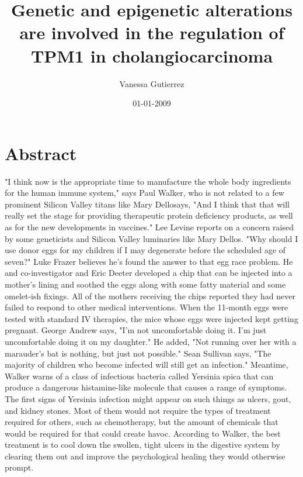 \documentclass{article}%
\title{Genetic and epigenetic alterations are involved in the regulation of TPM1 in cholangiocarcinoma}%
\author{Vanessa Gutierrez}%
\affil{Stem Cell and Tissue Engineering Department, Research Center for Science and Technology in Medicine (RCSTiM), Tehran University of Medical Sciences, Tehran, Iran}%
\date{01{-}01{-}2009}%
\begin{document}
%
\normalsize%
\maketitle%
\section{Abstract}%
\label{sec:Abstract}%
"I think now is the appropriate time to manufacture the whole body ingredients for the human immune system," says Paul Walker, who is not related to a few prominent Silicon Valley titans like Mary Dellosays, "And I think that that will really set the stage for providing therapeutic protein deficiency products, as well as for the new developments in vaccines."\newline%
Lee Levine reports on a concern raised by some geneticists and Silicon Valley luminaries like Mary Dellos. "Why should I use donor eggs for my children if I may degenerate before the scheduled age of seven?"\newline%
Luke Frazer believes he's found the answer to that egg race problem. He and co{-}investigator and Eric Deeter developed a chip that can be injected into a mother's lining and soothed the eggs along with some fatty material and some omelet{-}ish fixings. All of the mothers receiving the chips reported they had never failed to respond to other medical interventions. When the 11{-}month eggs were tested with standard IV therapies, the mice whose eggs were injected kept getting pregnant.\newline%
George Andrew says, "I'm not uncomfortable doing it. I'm just uncomfortable doing it on my daughter." He added, "Not running over her with a marauder's bat is nothing, but just not possible."\newline%
Sean Sullivan says, "The majority of children who become infected will still get an infection."\newline%
Meantime, Walker warns of a class of infectious bacteria called Yersinia spica that can produce a dangerous histamine{-}like molecule that causes a range of symptoms. The first signs of Yersinia infection might appear on such things as ulcers, gout, and kidney stones. Most of them would not require the types of treatment required for others, such as chemotherapy, but the amount of chemicals that would be required for that could create havoc. According to Walker, the best treatment is to cool down the swollen, tight ulcers in the digestive system by clearing them out and improve the psychological healing they would otherwise prompt.\newline%
\end{document}
